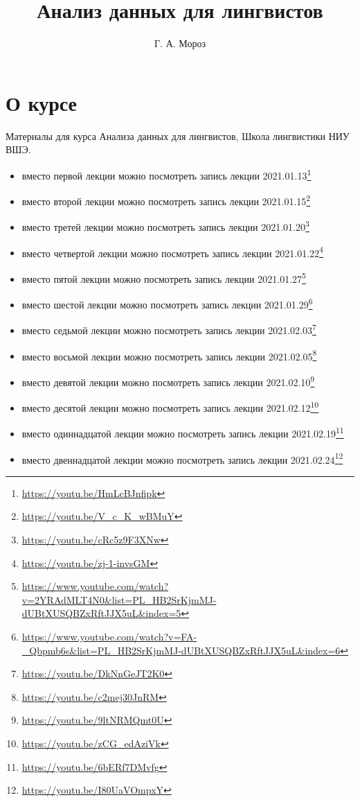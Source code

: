 \documentclass[
]{book}
\title{Анализ данных для лингвистов}
\author{Г. А. Мороз}
\date{}
\providecommand{\tightlist}{%
  \setlength{\itemsep}{0pt}\setlength{\parskip}{0pt}}
\renewcommand{\href}[2]{#2\footnote{\url{#1}}}
\begin{document}
\maketitle

{
\setcounter{tocdepth}{1}
\tableofcontents
}
\hypertarget{ux43e-ux43aux443ux440ux441ux435}{%
\chapter{О курсе}\label{ux43e-ux43aux443ux440ux441ux435}}

Материалы для курса Анализа данных для лингвистов, Школа лингвистики НИУ ВШЭ.

\begin{itemize}
\tightlist
\item
  вместо первой лекции можно посмотреть \href{https://youtu.be/HmLcBJnfipk}{запись лекции 2021.01.13}
\item
  вместо второй лекции можно посмотреть \href{https://youtu.be/V_c_K_wBMuY}{запись лекции 2021.01.15}
\item
  вместо третей лекции можно посмотреть \href{https://youtu.be/cRc5z9F3XNw}{запись лекции 2021.01.20}
\item
  вместо четвертой лекции можно посмотреть \href{https://youtu.be/zj-1-invsGM}{запись лекции 2021.01.22}
\item
  вместо пятой лекции можно посмотреть \href{https://www.youtube.com/watch?v=2YRAdMLT4N0\&list=PL_HB2SrKjmMJ-dUBtXUSQBZxRftJJX5uL\&index=5}{запись лекции 2021.01.27}
\item
  вместо шестой лекции можно посмотреть \href{https://www.youtube.com/watch?v=FA-_Qbpmb6s\&list=PL_HB2SrKjmMJ-dUBtXUSQBZxRftJJX5uL\&index=6}{запись лекции 2021.01.29}
\item
  вместо седьмой лекции можно посмотреть \href{https://youtu.be/DkNnGeJT2K0}{запись лекции 2021.02.03}
\item
  вместо восьмой лекции можно посмотреть \href{https://youtu.be/c2mej30JnRM}{запись лекции 2021.02.05}
\item
  вместо девятой лекции можно посмотреть \href{https://youtu.be/9ltNRMQmt0U}{запись лекции 2021.02.10}
\item
  вместо десятой лекции можно посмотреть \href{https://youtu.be/zCG_edAziVk}{запись лекции 2021.02.12}
\item
  вместо одиннадцатой лекции можно посмотреть \href{https://youtu.be/6bERf7DMvfg}{запись лекции 2021.02.19}
\item
  вместо двеннадцатой лекции можно посмотреть \href{https://youtu.be/I80UaVOmpxY}{запись лекции 2021.02.24}

\end{itemize}
\end{document}
